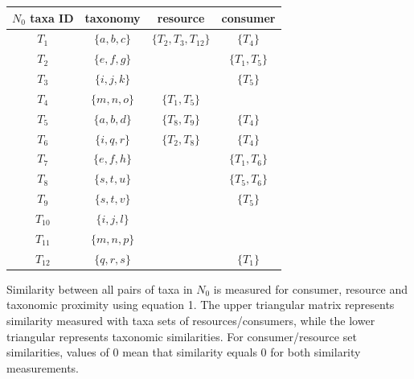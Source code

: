 \begin{singlespace}
    \begin{table}[h!]
      \centering
      \begin{tabular}{cccc}
        \hline
        $N_0$ taxa ID & taxonomy &          resource &             consumer        \\
        \hline
        \hline
        $T_1$ &         $\{a, b, c\}$ &     $\{T_2, T_3, T_{12}\}$ &    $\{T_4\}$         \\
        $T_2$ &         $\{e, f, g\}$ &      &                          $\{T_1, T_5\}$    \\
        $T_3$ &         $\{i, j, k\}$ &      &                          $\{T_5\}$         \\
        $T_4$ &         $\{m, n, o\}$ &     $\{T_1, T_5\}$ &                              \\
        $T_5$ &         $\{a, b, d\}$ &     $\{T_8, T_9\}$ &            $\{T_4\}$         \\
        $T_6$ &         $\{i, q, r\}$ &     $\{T_2, T_8\}$ &            $\{T_4\}$         \\
        $T_7$ &         $\{e, f, h\}$ &      &                          $\{T_1, T_6\}$    \\
        $T_8$ &         $\{s, t, u\}$ &      &                          $\{T_5, T_6\}$    \\
        $T_9$ &         $\{s, t, v\}$ &      &                          $\{T_5\}$         \\
        $T_{10}$ &      $\{i, j, l\}$ &      &                                            \\
        $T_{11}$ &      $\{m, n, p\}$ &      &                                            \\
        $T_{12}$ &      $\{q, r, s\}$ &      &                          $\{T_1\}$         \\
        \hline
      \end{tabular}
    \end{table}
\end{singlespace}

Similarity between all pairs of taxa in $N_0$ is measured for consumer, resource and taxonomic proximity using equation 1. The upper triangular matrix represents similarity measured with taxa sets of resources/consumers, while the lower triangular represents taxonomic similarities. For consumer/resource set similarities, values of 0 mean that similarity equals 0 for both similarity measurements.
\bigskip

